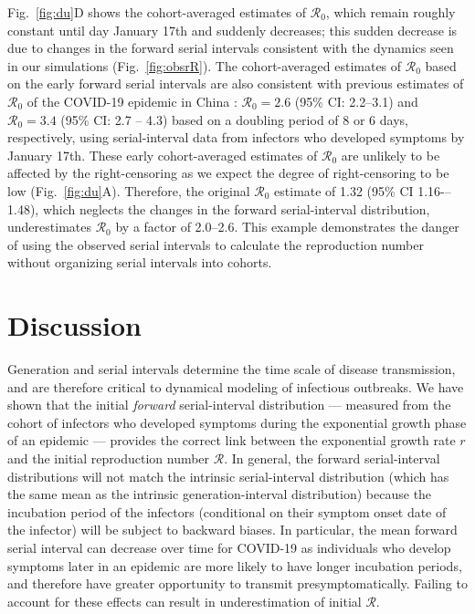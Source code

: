 \documentclass[12pt]{article}
\newcommand{\fref}[1]{Fig.~\ref{fig:#1}}
\newcommand{\Rx}[1]{\ensuremath{{\mathcal R}_{#1}}\xspace}
\newcommand{\Ro}{\Rx{0}}
\newcommand{\RR}{\ensuremath{{\mathcal R}}\xspace}
\begin{document}
\fref{du}D shows the cohort-averaged estimates of \Ro, which remain roughly constant until day January 17th and suddenly decreases;
this sudden decrease is due to changes in the forward serial intervals consistent with the dynamics seen in our simulations (\fref{obsrR}).
The cohort-averaged estimates of \Ro based on the early forward serial intervals are also consistent with previous estimates of \Ro of the COVID-19 epidemic in China \citep{majumder2020early, doi:10.1098/rsif.2020.0144}:
$\Ro = 2.6$ (95\% CI: 2.2--3.1) and $\Ro = 3.4$ (95\% CI: 2.7 -- 4.3) based on a doubling period of 8 or 6 days, respectively, using serial-interval data from infectors who developed symptoms by January 17th.
These early cohort-averaged estimates of \Ro are unlikely to be affected by the right-censoring as we expect the degree of right-censoring to be low (\fref{du}A).
Therefore, the original \Ro estimate of 1.32 (95\% CI 1.16-–1.48), which neglects the changes in the forward serial-interval distribution, underestimates \Ro by a factor of 2.0--2.6.
This example demonstrates the danger of using the observed serial intervals to calculate the reproduction number without organizing serial intervals into cohorts.

\section{Discussion}

Generation and serial intervals determine the time scale of disease transmission, and are therefore critical to dynamical modeling of infectious outbreaks.
We have shown that the initial \emph{forward} serial-interval distribution --- measured from the cohort of infectors who developed symptoms during the exponential growth phase of an epidemic --- provides the correct link between the exponential growth rate $r$ and the initial reproduction number \RR.
In general, the forward serial-interval distributions will not match the intrinsic serial-interval distribution (which has the same mean as the intrinsic generation-interval distribution) because the incubation period of the infectors (conditional on their symptom onset date of the infector) will be subject to backward biases.
In particular, the mean forward serial interval can decrease over time for COVID-19 as individuals who develop symptoms later in an epidemic are more likely to have longer incubation periods, and therefore have greater opportunity to transmit presymptomatically.
Failing to account for these effects can result in underestimation of initial \RR.
\end{document}
